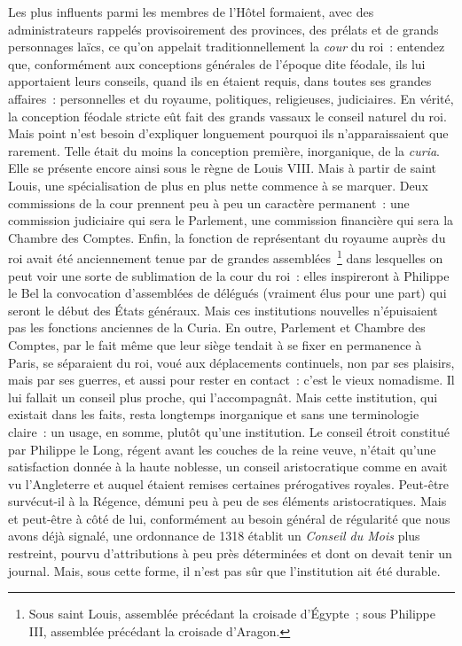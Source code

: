 \documentclass[french,twoside]{book} %
\begin{document}
Les plus influents parmi les membres de l’Hôtel formaient, avec des administrateurs rappelés provisoirement des provinces, des prélats et de grands personnages laïcs, ce qu’on appelait traditionnellement la \emph{cour} du roi : entendez que, conformément aux conceptions générales de l’époque dite féodale, ils lui apportaient leurs conseils, quand ils en étaient requis, dans toutes ses grandes affaires : personnelles et du royaume, politiques, religieuses, judiciaires. En vérité, la conception féodale stricte eût fait des grands vassaux le conseil naturel du roi. Mais point n’est besoin d’expliquer longuement pourquoi ils n’apparaissaient que rarement. Telle était du moins la conception première, inorganique, de la {\itshape curia}. Elle se présente encore ainsi sous le règne de Louis VIII. Mais à partir de saint Louis, une spécialisation de plus en plus nette commence à se marquer. Deux commissions de la cour prennent peu à peu un caractère permanent : une commission judiciaire qui sera le Parlement, une commission financière qui sera la Chambre des Comptes. Enfin, la fonction de représentant du royaume auprès du roi avait été anciennement tenue par de grandes assemblées \footnote{Sous saint Louis, assemblée précédant la croisade d’Égypte ; sous Philippe III, assemblée précédant la croisade d’Aragon.} dans lesquelles on peut voir une sorte de sublimation de la cour du roi : elles inspireront à Philippe le Bel la convocation d’assemblées de délégués (vraiment élus pour une part) qui seront le début des États généraux. Mais ces institutions nouvelles n’épuisaient pas les fonctions anciennes de la Curia. En outre, Parlement et Chambre des Comptes, par le fait même que leur siège tendait à se fixer en permanence à Paris, se séparaient du roi, voué aux déplacements continuels, non par ses plaisirs, mais par ses guerres, et aussi pour rester en contact : c’est le vieux nomadisme. Il lui fallait un conseil plus proche, qui l’accompagnât. Mais cette institution, qui existait dans les faits, resta longtemps inorganique et sans une terminologie claire : un usage, en somme, plutôt qu’une institution. Le conseil étroit constitué par Philippe le Long, régent avant les couches de la reine veuve, n’était qu’une satisfaction donnée à la haute noblesse, un conseil aristocratique comme en avait vu l’Angleterre et auquel étaient remises certaines prérogatives royales. Peut-être survécut-il à la Régence, démuni peu à peu de ses éléments aristocratiques. Mais et peut-être à côté de lui, conformément au besoin général de régularité que nous avons déjà signalé, une ordonnance de 1318 établit un \emph{Conseil du Mois} plus restreint, pourvu d’attributions à peu près déterminées et dont on devait tenir un journal. Mais, sous cette forme, il n’est pas sûr que l’institution ait été durable.
\end{document}
